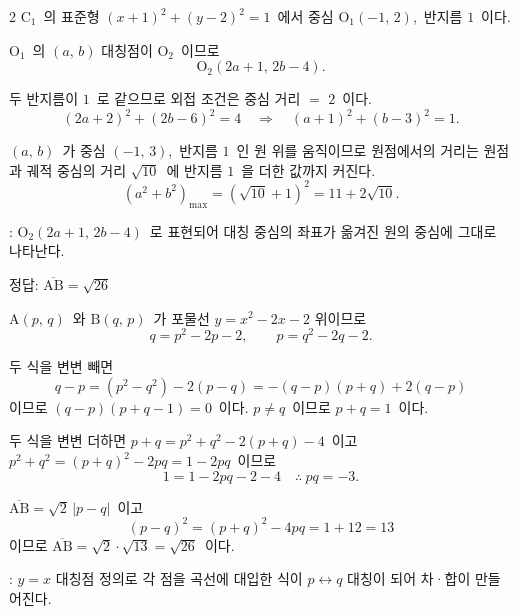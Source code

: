 \documentclass[10pt,fleqn]{article}
\begin{document}
\begin{multicols*}{2}
$\mathrm{C}_{1}$\ 의 표준형 $(x + 1)^{2} + (y - 2)^{2} = 1$\ 에서 중심 $\mathrm{O}_{1}(-1,\, 2)$,\ 반지름 $1$\ 이다.

$\mathrm{O}_{1}$\ 의 $(a,\, b)$ 대칭점이 $\mathrm{O}_{2}$\ 이므로
\[ \mathrm{O}_{2}(2a + 1,\, 2b - 4). \]

두 반지름이 $1$\ 로 같으므로 외접 조건은 중심 거리 $=$ $2$\ 이다.
\[ (2a + 2)^{2} + (2b - 6)^{2} = 4 \quad\Longrightarrow\quad (a + 1)^{2} + (b - 3)^{2} = 1. \]

$(a,\, b)$\ 가 중심 $(-1,\, 3)$,\ 반지름 $1$\ 인 원 위를 움직이므로 원점에서의 거리는 원점과 궤적 중심의 거리 $\sqrt{10}$\ 에 반지름 $1$\ 을 더한 값까지 커진다.
\[ (a^{2} + b^{2})_{\max} = (\sqrt{10} + 1)^{2} = 11 + 2\sqrt{10}. \]

\begin{dmcriticalpoint}
: $\mathrm{O}_{2}(2a + 1,\, 2b - 4)$\ 로 표현되어 대칭 중심의 좌표가 옮겨진 원의 중심에 그대로 나타난다.
\end{dmcriticalpoint}

\begin{dmanswerbox}
정답: $\overline{\mathrm{AB}}=\sqrt{26}$
\end{dmanswerbox}

$\mathrm{A}(p,\, q)$\ 와 $\mathrm{B}(q,\, p)$\ 가 포물선 $y = x^2 - 2x - 2$ 위이므로
\[ q = p^2 - 2p - 2,\qquad p = q^2 - 2q - 2. \]

두 식을 변변 빼면
\[ q - p = (p^2 - q^2) - 2(p - q) = -(q - p)(p + q) + 2(q - p) \]
이므로 $(q - p)(p + q - 1) = 0$\ 이다. $p \ne q$\ 이므로 $p + q = 1$\ 이다.

두 식을 변변 더하면 $p + q = p^2 + q^2 - 2(p + q) - 4$\ 이고 $p^2 + q^2 = (p+q)^2 - 2pq = 1 - 2pq$\ 이므로
\[ 1 = 1 - 2pq - 2 - 4 \quad\therefore\ pq = -3. \]

$\overline{\mathrm{AB}} = \sqrt{2}\, |p - q|$\ 이고
\[ (p - q)^2 = (p + q)^2 - 4pq = 1 + 12 = 13 \]
이므로 $\overline{\mathrm{AB}} = \sqrt{2}\cdot\sqrt{13} = \sqrt{26}$\ 이다.

\begin{dmcriticalpoint}
: $y = x$ 대칭점 정의로 각 점을 곡선에 대입한 식이 $p \leftrightarrow q$ 대칭이 되어 차·합이 만들어진다.
\end{dmcriticalpoint}

\end{multicols*}
\end{document}
